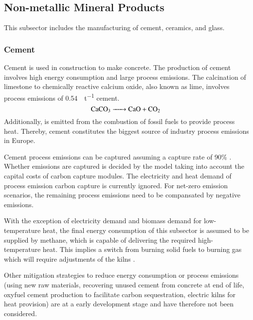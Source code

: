 
\subsection{Non-metallic Mineral Products}
\label{sec:si:industry:nmmp}

This subsector includes the manufacturing of cement, ceramics, and glass.

\subsubsection{Cement}

Cement is used in construction to make concrete. The production of cement
involves high energy consumption and large process emissions. The calcination of
limestone to chemically reactive calcium oxide, also known as lime, involves
process emissions of \SI{0.54}{\tco\per\tonne} cement.
\begin{equation}
    \ce{CaCO3 -> CaO + \co}
\end{equation}
Additionally, \co is emitted from the combustion of fossil fuels to provide
process heat. Thereby, cement constitutes the biggest source of industry
process emissions in Europe.

Cement process emissions can be captured assuming a capture rate of 90\%
\citeS{}. Whether emissions are captured is decided by the model taking into
account the capital costs of carbon capture modules. The electricity and heat
demand of process emission carbon capture is currently ignored. For net-zero
emission scenarios, the remaining process emissions need to be compansated by
negative emissions.

With the exception of electricity demand and biomass demand for low-temperature
heat, the final energy consumption of this subsector is assumed to be supplied
by methane, which is capable of delivering the required high-temperature heat.
This implies a switch from burning solid fuels to burning gas which will require
adjustments of the kilns .

Other mitigation strategies to reduce energy consumption or process emissions
(using new raw materials, recovering unused cement from concrete at end of life,
oxyfuel cement production to facilitate carbon sequestration, electric kilns for
heat provision) are at a early development stage and have therefore not been
considered.

